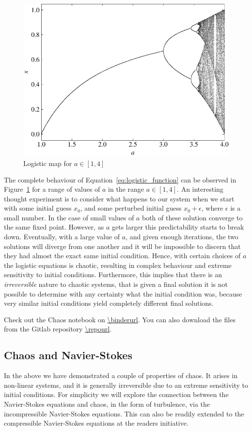 \begin{figure}[htbp]
	\centering
	\includegraphics[width=0.65\linewidth]{Pictures/logistic_map}
	\caption{Logistic map for $a\in[1,4]$}
	\label{fig:logistic_map}
\end{figure}
The complete behaviour of Equation~\ref{eq:logistic_function} can be observed in Figure~\ref{fig:logistic_map} for a range of values of $a$ in the range $a\in[1,4]$. An interesting thought experiment is to consider what happens to our system when we start with some initial guess $x_0$, and some perturbed initial guess $x_0 + \epsilon$, where $\epsilon$ is a small number. In the case of small values of $a$ both of these solution converge to the same fixed point. However, as $a$ gets larger this predictability starts to break down. Eventually, with a large value of $a$, and given enough iterations, the two solutions will diverge from one another and it will be impossible to discern that they had almost the exact same initial condition. Hence, with certain choices of $a$ the logistic equations is chaotic, resulting in complex behaviour and extreme sensitivity to initial conditions. Furthermore, this implies that there is an {\it irreversible} nature to chaotic systems, that is given a final solution it is not possible to determine with any certainty what the initial condition was, because very similar initial conditions yield completely different final solutions.
\begin{jupyternote}
	Check out the Chaos notebook on \url{\binderurl}. You can also download the files from the Gitlab repository \url{\repourl}.
\end{jupyternote}

\subsection{Chaos and Navier-Stokes}
In the above we have demonstrated a couple of properties of chaos. It arises in non-linear systems, and it is generally irreversible due to an extreme sensitivity to initial conditions. For simplicity we will explore the connection between the Navier-Stokes equations and chaos, in the form of turbulence, via the incompressible Navier-Stokes equations. This can also be readily extended to the compressible Navier-Stokes equations at the readers initiative.

